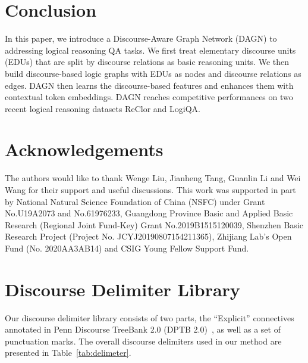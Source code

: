 \documentclass[11pt]{article}
\newcommand{\moe}[1]{{\color{black} #1}}
\begin{document}
\section{Conclusion}
\vspace{-1mm}
\moe{In this paper, we introduce a Discourse-Aware Graph Network (DAGN) to addressing logical reasoning QA tasks. We first treat elementary discourse units (EDUs) that are split by discourse relations as basic reasoning units. We then build discourse-based logic graphs with EDUs as nodes and discourse relations as edges. DAGN then learns the discourse-based features and enhances them with contextual token embeddings. DAGN reaches competitive performances on two recent logical reasoning datasets ReClor and LogiQA.}




\section*{Acknowledgements}
\vspace{-1mm}
The authors would like to thank Wenge Liu, Jianheng Tang, Guanlin Li and Wei Wang for their support and useful discussions. 
This work was supported in part by National Natural Science Foundation of China (NSFC) under Grant No.U19A2073 and No.61976233, Guangdong Province Basic and Applied Basic Research (Regional Joint Fund-Key) Grant No.2019B1515120039,  Shenzhen Basic Research Project (Project No. JCYJ20190807154211365), Zhijiang Lab’s Open Fund (No. 2020AA3AB14) and CSIG Young Fellow Support Fund.







\newpage
\appendix
\section{Discourse Delimiter Library}
\label{sec:library}
Our discourse delimiter library consists of two parts, the ``Explicit'' connectives annotated in Penn Discourse TreeBank 2.0 (DPTB 2.0)~\cite{prasad2008penn}, as well as a set of punctuation marks. The overall discourse delimiters used in our method are presented in Table~\ref{tab:delimeter}.
\end{document}
